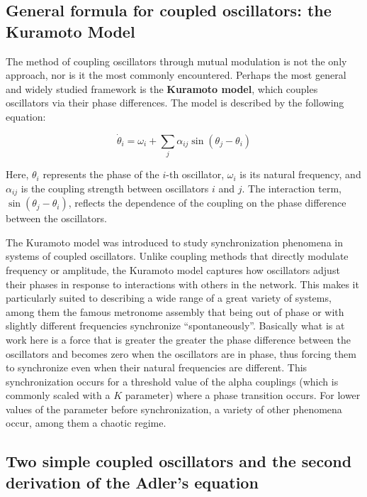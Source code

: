 \documentclass{article}
\begin{document}
\subsection{General formula for coupled oscillators: the Kuramoto Model}

The method of coupling oscillators through mutual modulation is not the only approach, nor is it the most commonly encountered. Perhaps the most general and widely studied framework is the {\bf Kuramoto model}, which couples oscillators via their phase differences. The model is described by the following equation:


\begin{equation} \label{eq_kuramoto}
    \dot{\theta}_i = \omega_i + \sum_j \alpha_{ij} \sin({\theta_j}-{\theta_i})
\end{equation}

Here, $\theta_i$ represents the phase of the $i$-th oscillator, $\omega_i$ is its natural frequency, and $\alpha_{ij}$ is the coupling strength between oscillators $i$ and $j$. The interaction term, $\sin(\theta_j - \theta_i)$, reflects the dependence of the coupling on the phase difference between the oscillators.

The Kuramoto model was introduced to study synchronization phenomena in systems of coupled oscillators. 
Unlike coupling methods that directly modulate frequency or amplitude, the Kuramoto model captures how oscillators adjust their phases in response to interactions with others in the network. 
This makes it particularly suited to describing a wide range of a great variety of systems, among them the famous metronome assembly that being out of phase or with slightly different frequencies synchronize “spontaneously”. 
Basically what is at work here is a force that is greater the greater the phase difference between the oscillators and becomes zero when the oscillators are in phase, thus forcing them to synchronize even when their natural frequencies are different. 
This synchronization occurs for a threshold value of the alpha couplings (which is commonly scaled with a $K$ parameter) where a phase transition occurs.
For lower values of the parameter before synchronization, a variety of other phenomena occur, among them a chaotic regime.




\subsection{Two simple coupled oscillators and the second derivation of the Adler's equation}
\end{document}
